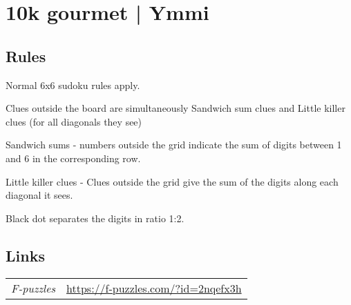 \section[10k gourmet | Ymmi (\emph{Sudoku Variant})]{10k gourmet | {\normalfont Ymmi}}
\label{sec:06-10k-gourmet-ymmi}

\subsection*{Rules}
\begin{markdown}
Normal 6x6 sudoku rules apply. 

Clues outside the board are simultaneously Sandwich sum clues and Little killer clues (for all diagonals they see) 

Sandwich sums - numbers outside the grid indicate the sum of digits between 1 and 6 in the corresponding row\column.

Little killer clues - Clues outside the grid give the sum of the digits along each diagonal it sees. 

Black dot separates the digits in ratio 1:2.
\end{markdown}
\subsection*{Links}
\begin{tabularx}{\textwidth}{l X}
\emph{F-puzzles} & \url{https://f-puzzles.com/?id=2nqefx3h} \\
\end{tabularx}
\pagebreak
